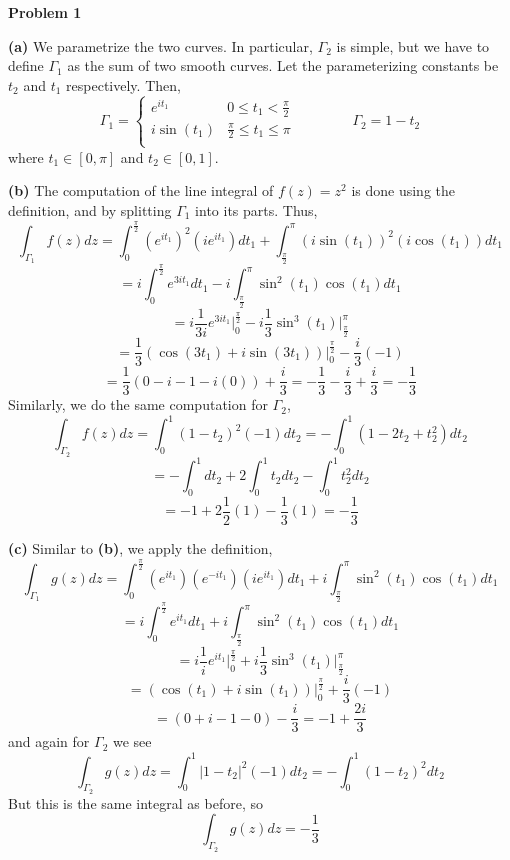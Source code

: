 \documentclass[10pt]{article}
\begin{document}
\textbf{Problem 1}

\textbf{(a)}
We parametrize the two curves. In particular, $\Gamma_{2}$ is simple, but we have to define $\Gamma_{1}$ as the sum of two smooth curves. Let the parameterizing constants be $t_{2}$ and $t_{1}$ respectively. Then,
\[
  \Gamma_{1}= 
  \begin{cases} 
    e^{it_{1}} & 0 \leq t_{1} < \frac{\pi}{2} \\
    i\sin(t_{1}) & \frac{\pi}{2}\leq t_{1}\leq \pi \\
  \end{cases}
  \hspace{4em}
  \Gamma_{2}=1-t_{2}
\]
where $t_{1} \in [0,\pi]$ and $t_{2} \in [0,1]$.

\textbf{(b)}
The computation of the line integral of $f(z) = z^{2}$ is done using the definition, and by splitting $\Gamma_{1}$ into its parts. Thus,
$$\int_{\Gamma_{1}}f(z)dz = \int_{0}^{\frac{\pi}{2}}(e^{it_{1}})^{2}(ie^{it_{1}})dt_{1} + \int_{\frac{\pi}{2}}^{\pi}(i\sin(t_{1}))^{2}(i\cos(t_{1}))dt_{1}$$
$$ = i\int_{0}^{\frac{\pi}{2}}e^{3it_{1}}dt_{1} -i \int_{\frac{\pi}{2}}^{\pi}\sin^{2}(t_{1})\cos(t_{1})dt_{1}$$
$$= i\frac{1}{3i}e^{3it_{1}}\biggr\rvert_{0}^{\frac{\pi}{2}} - i\frac{1}{3}\sin^{3}(t_{1})\biggr\rvert_{\frac{\pi}{2}}^{\pi}$$
$$= \frac{1}{3}(\cos(3t_{1}) + i\sin(3t_{1}))\biggr\rvert_{0}^{\frac{\pi}{2}} - \frac{i}{3}(-1)$$
$$= \frac{1}{3}(0 - i - 1 - i(0)) + \frac{i}{3} = -\frac{1}{3} - \frac{i}{3} + \frac{i}{3} = -\frac{1}{3}$$
Similarly, we do the same computation for $\Gamma_{2}$,
$$\int_{\Gamma_{2}}f(z)dz = \int_{0}^{1}(1-t_{2})^{2}(-1)dt_{2} = - \int_{0}^{1}(1 - 2t_{2} + t_{2}^{2})dt_{2}$$
$$ = -\int_{0}^{1}dt_{2} + 2\int_{0}^{1}t_{2}dt_{2} - \int_{0}^{1}t_{2}^{2}dt_{2}$$
$$ = -1 + 2\frac{1}{2}(1) - \frac{1}{3}(1) = -\frac{1}{3}$$

\textbf{(c)}
Similar to \textbf{(b)}, we apply the definition,
$$\int_{\Gamma_{1}}g(z)dz = \int_{0}^{\frac{\pi}{2}}(e^{it_{1}})(e^{-it_{1}})(ie^{it_{1}})dt_{1} + i\int_{\frac{\pi}{2}}^{\pi}\sin^{2}(t_{1})\cos(t_{1})dt_{1}$$
$$ = i\int_{0}^{\frac{\pi}{2}}e^{it_{1}}dt_{1} + i\int_{\frac{\pi}{2}}^{\pi}\sin^{2}(t_{1})\cos(t_{1})dt_{1}$$
$$ = i\frac{1}{i}e^{it_{1}}\biggr\rvert_{0}^{\frac{\pi}{2}} +i\frac{1}{3}\sin^{3}(t_{1})\biggr\rvert_{\frac{\pi}{2}}^{\pi}$$
$$= (\cos(t_{1}) + i\sin(t_{1}))\biggr\rvert_{0}^{\frac{\pi}{2}} + \frac{i}{3}(-1)$$
$$ = (0 + i - 1 - 0) - \frac{i}{3} = -1 + \frac{2i}{3}$$
and again for $\Gamma_{2}$ we see
$$\int_{\Gamma_{2}}g(z)dz = \int_{0}^{1}|1-t_{2}|^{2}(-1)dt_{2} = -\int_{0}^{1}(1-t_{2})^{2}dt_{2}$$
But this is the same integral as before, so
$$\int_{\Gamma_{2}}g(z)dz = -\frac{1}{3}$$
\end{document}
